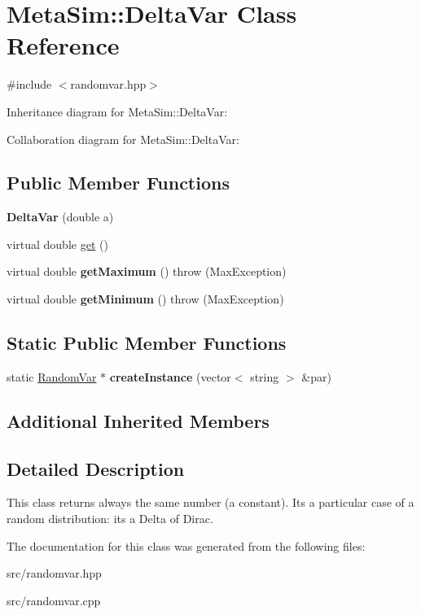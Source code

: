 \hypertarget{classMetaSim_1_1DeltaVar}{}\section{Meta\+Sim\+:\+:Delta\+Var Class Reference}
\label{classMetaSim_1_1DeltaVar}


{\ttfamily \#include $<$randomvar.\+hpp$>$}



Inheritance diagram for Meta\+Sim\+:\+:Delta\+Var\+:


Collaboration diagram for Meta\+Sim\+:\+:Delta\+Var\+:
\subsection*{Public Member Functions}
\begin{DoxyCompactItemize}
\item 
{\bfseries Delta\+Var} (double a)
\item 
virtual double \hyperlink{group__metasim__random_ga6657b65ec15929668867fbf873c4d801}{get} ()
\item 
virtual double {\bfseries get\+Maximum} ()  throw (\+Max\+Exception)
\item 
virtual double {\bfseries get\+Minimum} ()  throw (\+Max\+Exception)
\end{DoxyCompactItemize}
\subsection*{Static Public Member Functions}
\begin{DoxyCompactItemize}
\item 
static \hyperlink{classMetaSim_1_1RandomVar}{Random\+Var} $\ast$ {\bfseries create\+Instance} (vector$<$ string $>$ \&par)
\end{DoxyCompactItemize}
\subsection*{Additional Inherited Members}


\subsection{Detailed Description}
This class returns always the same number (a constant). It\textquotesingle{}s a particular case of a random distribution\+: it\textquotesingle{}s a Delta of Dirac. 

The documentation for this class was generated from the following files\+:\begin{DoxyCompactItemize}
\item 
src/randomvar.\+hpp\item 
src/randomvar.\+cpp\end{DoxyCompactItemize}
